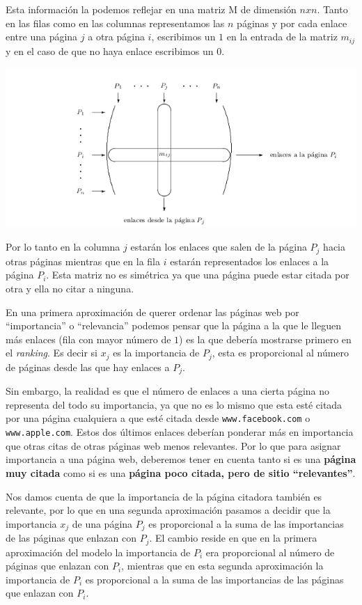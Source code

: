 \documentclass[size=a4, parskip=half, titlepage=false, toc=flat, toc=bib, 12pt, twoside]{scrartcl}
\theoremstyle{theorem-style}
\theoremstyle{definition-style}
\theoremstyle{remark-style}
\theoremstyle{example-style}
\theoremstyle{definition-style}
\theoremstyle{remark-style}
\begin{document}
Esta información la podemos reflejar en una matriz M de dimensión $nxn$. Tanto en las filas como en las columnas representamos las $n$ páginas y por cada enlace entre una página $j$ a otra página $i$, escribimos un $1$ en la entrada de la
matriz $m_{ij}$ y en el caso de que no haya enlace escribimos un $0$.

\includegraphics[width=1.0\textwidth]{./img/matriz}

Por lo tanto en la columna $j$ estarán los enlaces que salen de la página $P_j$ hacia otras páginas
mientras que en la fila $i$ estarán representados los enlaces a la página $P_i$. Esta matriz
no es simétrica ya que una página puede estar citada por otra y ella no citar a ninguna.

En una primera aproximación de querer ordenar las páginas web por ``importancia'' o ``relevancia'' podemos pensar que la página a la que le lleguen más enlaces (fila con mayor número de $1$) es la que debería mostrarse primero en el \textit{ranking}. Es decir si $x_j$ es la importancia de $P_j$, esta es proporcional al número de páginas desde las que hay enlaces a $P_j$.

Sin embargo, la realidad es que el número de enlaces a una cierta página no representa del todo su importancia, ya que no es lo mismo que esta esté citada por una página cualquiera a que esté citada desde \verb|www.facebook.com| o \verb|www.apple.com|. Estos dos últimos enlaces deberían ponderar más en importancia que otras citas de otras páginas web menos relevantes. Por lo que para asignar importancia a una página web, deberemos tener en cuenta tanto si es una \textbf{página muy citada} como si es una \textbf{página poco citada, pero de sitio ``relevantes''}.

Nos damos cuenta de que la importancia de la página citadora también es relevante, por lo que en una segunda aproximación pasamos a decidir que la importancia $x_j$ de una página $P_j$ es proporcional a la suma de las importancias de las páginas que enlazan con $P_j$. El cambio reside en que en la primera aproximación del modelo la importancia de $P_i$ era proporcional al número de páginas que enlazan con $P_i$, mientras que en esta segunda aproximación la importancia de $P_i$ es proporcional a la suma de las importancias de las páginas que enlazan con $P_i$.
\end{document}
